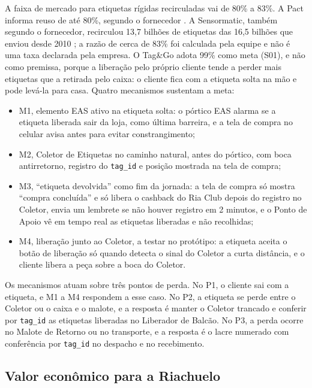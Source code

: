 A faixa de mercado para etiquetas rígidas recirculadas vai de 80\% a 83\%. A Pact informa reuso de até 80\%, segundo o fornecedor \cite{pact2026etiquetas}. A Sensormatic, também segundo o fornecedor, recirculou 13,7 bilhões de etiquetas das 16,5 bilhões que enviou desde 2010 \cite{sensormatic2024recirculacao}; a razão de cerca de 83\% foi calculada pela equipe e não é uma taxa declarada pela empresa. O Tag\&Go adota 99\% como meta (S01), e não como premissa, porque a liberação pelo próprio cliente tende a perder mais etiquetas que a retirada pelo caixa: o cliente fica com a etiqueta solta na mão e pode levá-la para casa. Quatro mecanismos sustentam a meta:
\begin{itemize}
    \item M1, elemento EAS ativo na etiqueta solta: o pórtico EAS alarma se a etiqueta liberada sair da loja, como última barreira, e a tela de compra no celular avisa antes para evitar constrangimento;
    \item M2, Coletor de Etiquetas no caminho natural, antes do pórtico, com boca antirretorno, registro do \texttt{tag\_id} e posição mostrada na tela de compra;
    \item M3, ``etiqueta devolvida'' como fim da jornada: a tela de compra só mostra ``compra concluída'' e só libera o cashback do Ria Club depois do registro no Coletor, envia um lembrete se não houver registro em 2 minutos, e o Ponto de Apoio vê em tempo real as etiquetas liberadas e não recolhidas;
    \item M4, liberação junto ao Coletor, a testar no protótipo: a etiqueta aceita o botão de liberação só quando detecta o sinal do Coletor a curta distância, e o cliente libera a peça sobre a boca do Coletor.
\end{itemize}

Os mecanismos atuam sobre três pontos de perda. No P1, o cliente sai com a etiqueta, e M1 a M4 respondem a esse caso. No P2, a etiqueta se perde entre o Coletor ou o caixa e o malote, e a resposta é manter o Coletor trancado e conferir por \texttt{tag\_id} as etiquetas liberadas no Liberador de Balcão. No P3, a perda ocorre no Malote de Retorno ou no transporte, e a resposta é o lacre numerado com conferência por \texttt{tag\_id} no despacho e no recebimento.

\subsection{Valor econômico para a Riachuelo}
\label{sub:r2-valor-riachuelo}

